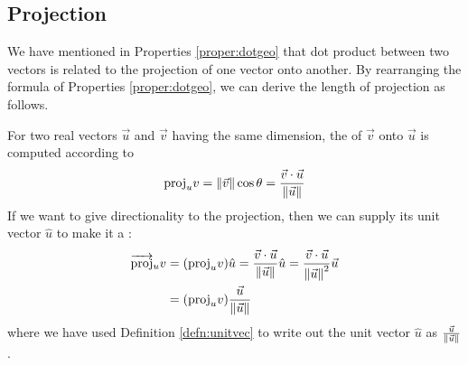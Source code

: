 \subsection{Projection}
\label{section:proj}
We have mentioned in Properties \ref{proper:dotgeo} that dot product between two vectors is related to the projection of one vector onto another. By rearranging the formula of Properties \ref{proper:dotgeo}, we can derive the length of projection as follows.
\begin{center}
\end{center}
\begin{proper}
\label{proper:proj}
For two real vectors $\vec{u}$ and $\vec{v}$ having the same dimension, the  of $\vec{v}$ onto $\vec{u}$ is computed according to
\begin{align*}
\text{proj}_u v = \norm{\vec{v}} \cos\theta = \frac{\vec{v} \cdot \vec{u}}{\norm{\vec{u}}}    
\end{align*}
If we want to give directionality to the projection, then we can supply its unit vector $\hat{u}$ to make it a :
\begin{align*}
\overrightarrow{\text{proj}}_u v &= (\text{proj}_u v) \hat{u} = \frac{\vec{v} \cdot \vec{u}} {\norm{\vec{u}}} \hat{u} = \frac{\vec{v} \cdot \vec{u}}{\norm{\vec{u}}^2} \vec{u} \\
&= (\text{proj}_u v) \frac{\vec{u}}{\norm{\vec{u}}}
\end{align*}
where we have used Definition \ref{defn:unitvec} to write out the unit vector $\hat{u}$ as $\frac{\vec{u}}{\norm{\vec{u}}}$.
\end{proper}

